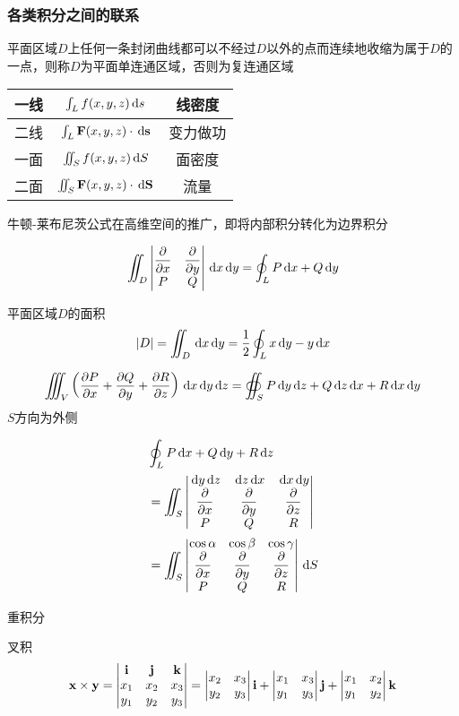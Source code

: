 \subsubsection{各类积分之间的联系}
\begin{definition}[连通区域]
平面区域$D$上任何一条封闭曲线都可以不经过$D$以外的点而连续地收缩为属于$D$的一点，则称$D$为平面单连通区域，否则为复连通区域
\end{definition}
\begin{center}
\begin{tabular}{|c|c|c|}\hline
一线 & $\int_Lf(x,y,z)\diff s$ & 线密度\\\hline
二线 & $\int_L\vF(x,y,z)\cdot\diff\vs$ & 变力做功\\\hline
一面 & $\iint_S f(x,y,z)\diff S$ & 面密度\\\hline
二面 & $\iint_S\vF(x,y,z)\cdot\diff\vS$ & 流量\\\hline
\end{tabular}
\end{center}
牛顿-莱布尼茨公式在高维空间的推广，即将内部积分转化为边界积分
\begin{theorem}[格林(Green)公式]
\[\iint_D\vmat{\pd{}{x}&\pd{}{y}\\P&Q}\diff x\diff y=\oint_LP\diff x+Q\diff y\]
\end{theorem}
平面区域$D$的面积
\[|D|=\iint_D\diff x\diff y=\frac{1}{2}\oint_Lx\diff y-y\diff x\]
\begin{theorem}[高斯(Gauss)公式]
\[\iiint_V\lrp{\pd{P}{x}+\pd{Q}{y}+\pd{R}{z}}\diff x\diff y\diff z=\oiint_SP\diff y\diff z+Q\diff z\diff x+R\diff x\diff y\]
$S$方向为外侧
\end{theorem}
\begin{theorem}
\[\begin{aligned}
&\oint_LP\diff x+Q\diff y+R\diff z\\
&=\iint_S\vmat{\diff y\diff z&\diff z\diff x&\diff x\diff y\\\pd{}{x}&\pd{}{y}&\pd{}{z}\\P&Q&R}\\
&=\iint_S\vmat{\cos\alpha&\cos\beta&\cos\gamma\\\pd{}{x}&\pd{}{y}&\pd{}{z}\\P&Q&R}\diff S
\end{aligned}\]
\end{theorem}

重积分

叉积
\[\vx\times\vy=\vmat{\vi&\vj&\vk\\x_1&x_2&x_3\\y_1&y_2&y_3}=\vmat{x_2&x_3\\y_2&y_3}\vi+\vmat{x_1&x_3\\y_1&y_3}\vj+\vmat{x_1&x_2\\y_1&y_2}\vk\]


